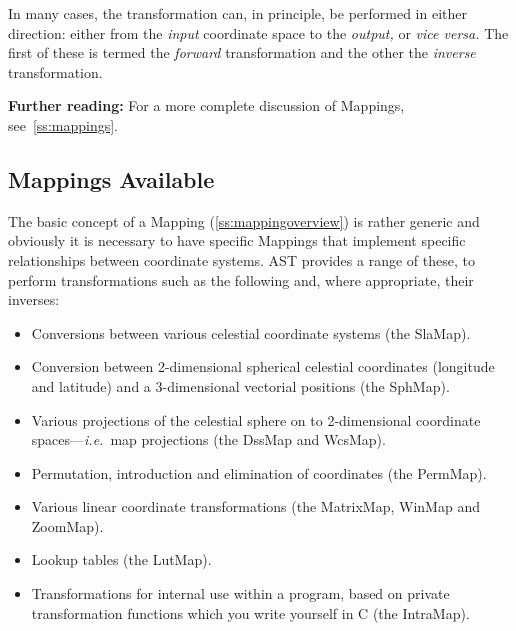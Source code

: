 \documentclass[twoside,11pt]{article}
\newcommand{\htmlref}[2]{#1}
\newcommand{\secref}[1]{\S\ref{#1}}
\renewcommand{\secref}[1]{\ref{#1}}
\begin{document}
In many cases, the transformation can, in principle, be performed in
either direction: either from the {\em{input}} coordinate space to the
{\em{output,}} or {\em{vice versa.}} The first of these is termed the
{\em{forward}} transformation and the other the {\em{inverse}}
transformation.

{\bf{Further reading:}} For a more complete discussion of Mappings,
see~\secref{ss:mappings}.

\subsection{\label{ss:mappingselection}Mappings Available}

The basic concept of a \htmlref{Mapping}{Mapping} (\secref{ss:mappingoverview}) is rather
generic and obviously it is necessary to have specific Mappings that
implement specific relationships between coordinate systems. AST
provides a range of these, to perform transformations such as the
following and, where appropriate, their inverses:

\begin{itemize}
\item Conversions between various celestial coordinate systems (the
\htmlref{SlaMap}{SlaMap}).

\item Conversion between 2-dimensional spherical celestial coordinates
(longitude and latitude) and a 3-dimensional vectorial positions (the \htmlref{SphMap}{SphMap}).

\item Various projections of the celestial sphere on to 2-dimensional
coordinate spaces---{\em{i.e.}}\ map projections (the \htmlref{DssMap}{DssMap} and \htmlref{WcsMap}{WcsMap}).

\item Permutation, introduction and elimination of coordinates (the
\htmlref{PermMap}{PermMap}).

\item Various linear coordinate transformations (the \htmlref{MatrixMap}{MatrixMap}, \htmlref{WinMap}{WinMap}
and \htmlref{ZoomMap}{ZoomMap}).

\item Lookup tables (the \htmlref{LutMap}{LutMap}).

\item Transformations for internal use within a program, based on
private transformation functions which you write yourself in C (the
\htmlref{IntraMap}{IntraMap}).
\end{itemize}
\end{document}
